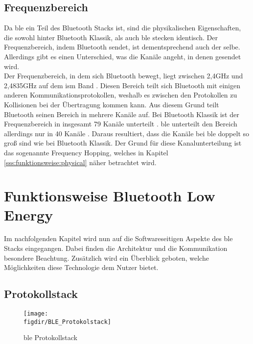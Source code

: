 \subsection{Frequenzbereich}
\label{ss:grundlagen:frequenz}

Da \ac{ble} ein Teil des Bluetooth Stacks ist, sind die physikalischen Eigenschaften, die sowohl hinter Bluetooth Klassik, als auch \ac{ble} stecken identisch. Der Frequenzbereich, indem Bluetooth sendet, ist dementsprechend auch der selbe. Allerdings gibt es einen Unterschied, was die Kanäle angeht, in denen gesendet wird.\\

\noindent Der Frequenzbereich, in dem sich Bluetooth bewegt, liegt zwischen 2,4GHz und 2,4835GHz auf dem \ac{ism} Band \cite[Seite 16]{Townsend14:GSB}. Diesen Bereich teilt sich Bluetooth mit einigen anderen Kommunikationsprotokollen, weshalb es zwischen den Protokollen zu Kollisionen bei der Übertragung kommen kann. Aus diesem Grund teilt Bluetooth seinen Bereich in mehrere Kanäle auf. Bei Bluetooth Klassik ist der Frequenzbereich in insgesamt 79 Kanäle unterteilt \cite[Seite 410]{Sauter18:GMK}. \ac{ble} unterteilt den Bereich allerdings nur in 40 Kanäle \cite[Seite 16]{Townsend14:GSB}. Daraus resultiert, dass die Kanäle bei \ac{ble} doppelt so groß sind wie bei Bluetooth Klassik. Der Grund für diese Kanalunterteilung ist das sogenannte Frequency Hopping, welches in Kapitel \ref{sss:funktionsweise:physical} näher betrachtet wird.\\  

\section{Funktionsweise Bluetooth Low Energy}
\label{s:funktionsweise}

Im nachfolgenden Kapitel wird nun auf die Softwareseitigen Aspekte des \ac{ble} Stacks eingegangen. Dabei finden die Architektur und die Kommunikation besondere Beachtung. Zusätzlich wird ein Überblick geboten, welche Möglichkeiten diese Technologie dem Nutzer bietet.\\  

\subsection{Protokollstack}
\label{ss:funktionsweise:protokollstack}

\begin{figure}[h]
	\centering
	\texttt{[image: \\figdir/BLE\_Protokolstack]}
	\caption{\ac{ble} Protokollstack \cite[Seite 16]{Townsend14:GSB}}
	\label{FIG:protokollstack}
\end{figure}


